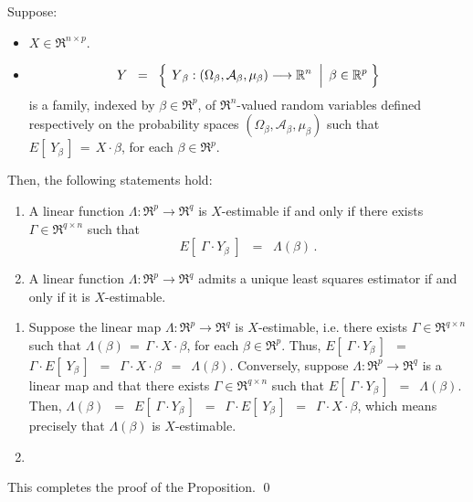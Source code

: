 \begin{proposition}
\mbox{}\vskip 0.1cm\noindent
Suppose:
\begin{itemize}
\item
	$X \in \Re^{n \times p}$.
\item
	\begin{equation*}
	Y
	\;\; = \;\;
		\left\{\;
		\left.
		\overset{{\color{white}.}}{Y}_{\beta} : (\Omega_{\beta},\mathcal{A}_{\beta},\mu_{\beta}) \longrightarrow \Re^{n}
		\;\;\right\vert\;
		\beta \in \Re^{p}
		\;\right\}
	\end{equation*}
	is a family, indexed by $\beta \in \Re^{p}$,
	of $\Re^{n}$-valued random variables defined respectively on the 
	probability spaces $(\Omega_{\beta},\mathcal{A}_{\beta},\mu_{\beta})$ 
	such that $E\!\left[\;Y_{\beta}\,\right] \,=\, X \cdot \beta$, for each $\beta \in \Re^{p}$.
\end{itemize}
Then, the following statements hold:
\begin{enumerate}
\item
	A linear function $\Lambda : \Re^{p} \longrightarrow \Re^{q}$ is $X$-estimable
	if and only if there exists $\Gamma \in \Re^{q \times n}$ such that
	\begin{equation*}
	E\!\left[\;\Gamma \cdot Y_{\beta}\;\right] \;\; = \;\; \Lambda(\beta)\,.
	\end{equation*}
\item
	A linear function $\Lambda : \Re^{p} \longrightarrow \Re^{q}$ admits a unique
	least squares estimator if and only if it is $X$-estimable.	
\end{enumerate}
\end{proposition}
\proof
\begin{enumerate}
\item
	Suppose the linear map $\Lambda : \Re^{p} \longrightarrow \Re^{q}$
	is $X$-estimable, i.e. there exists $\Gamma \in \Re^{q \times n}$ such that
	$\Lambda(\beta) \,=\, \Gamma \cdot X \cdot \beta$, for each $\beta \in \Re^{p}$.
	Thus,
	$E\!\left[\;\Gamma \cdot Y_{\beta}\,\right]$
	\,$=$\, $\Gamma \cdot E\!\left[\;Y_{\beta}\,\right]$
	\,$=$\, $\Gamma \cdot X \cdot \beta$
	\,$=$\, $\Lambda(\beta)$.
	Conversely, suppose $\Lambda : \Re^{p} \longrightarrow \Re^{q}$ is a linear map
	and that there exists $\Gamma \in \Re^{q \times n}$ such that $E\!\left[\;\Gamma \cdot Y_{\beta}\,\right]$
	\,$=$\, $\Lambda(\beta)$. Then,
	$\Lambda(\beta)$
	\,$=$\, $E\!\left[\;\Gamma \cdot Y_{\beta}\,\right]$
	\,$=$\, $\Gamma \cdot E\!\left[\;Y_{\beta}\,\right]$
	\,$=$\, $\Gamma \cdot X \cdot \beta$,
	which means precisely that $\Lambda(\beta)$ is $X$-estimable.
\item
\end{enumerate}
This completes the proof of the Proposition.
\qed


